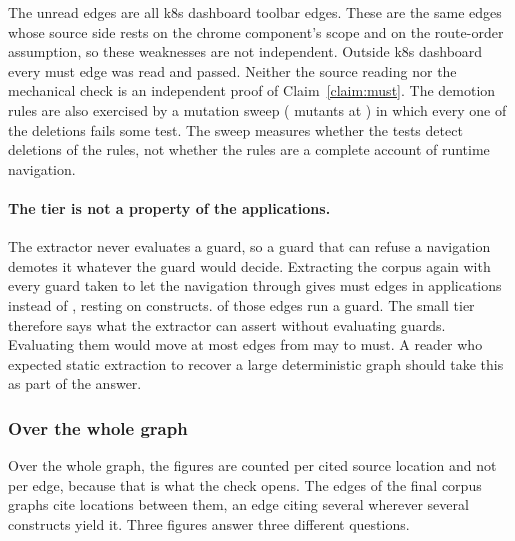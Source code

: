 The \MustWitnessUnread{} unread edges are all k8s dashboard toolbar edges. These are the same edges whose source side rests on the
chrome component's scope and on the route-order assumption, so these weaknesses are not independent.
Outside k8s dashboard every must edge was read and passed. Neither the source reading nor the
mechanical check is an independent proof of Claim~\ref{claim:must}. The demotion rules are also
exercised by a mutation sweep (\SweepMutants{} mutants at \texttt{\SweepCommit}) in which every
one of the \SweepMutants{} deletions fails some test. The sweep measures whether the tests detect
deletions of the rules, not whether the rules are a complete account of runtime navigation.

\paragraph{The tier is not a property of the applications.} The extractor never evaluates a guard, so
a guard that can refuse a navigation demotes it whatever the guard would decide. Extracting the corpus
again with every guard taken to let the navigation through gives \GuardOnlyMust{} must edges in
\GuardOnlyApps{} applications instead of \CensusMust{}, resting on \GuardOnlySites{} constructs.
\GuardOnlyGuarded{} of those edges run a guard. The
small tier therefore says what the extractor can assert without evaluating guards. Evaluating them
would move at most \GuardOnlyGuarded{} edges from may to must. A reader who expected static
extraction to recover a large deterministic graph should take this as part of the answer.

\subsubsection{Over the whole graph}

Over the whole graph, the figures are counted per cited source location and not per edge, because that
is what the check opens. The \RoundTwoEdges{} edges of the final corpus graphs cite \RoundTwoSites{}
locations between them, an edge citing several wherever several constructs yield it. Three figures
answer three different questions.

